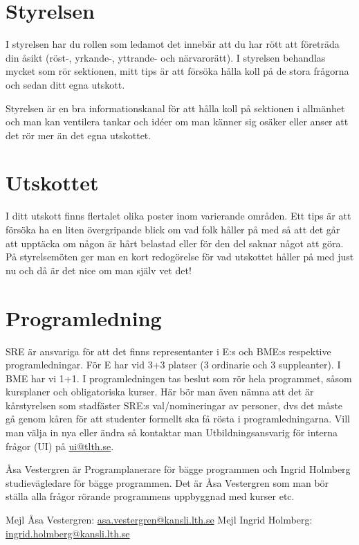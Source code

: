 \documentclass[10pt]{article}
\begin{document}
\newpage
\section{Styrelsen}
I styrelsen har du rollen som ledamot det innebär att du har rött att företräda din åsikt (röst-, yrkande-, yttrande- och närvarorätt). I styrelsen behandlas mycket som rör sektionen, mitt tips är att försöka hålla koll på de stora frågorna och sedan ditt egna utskott. 

Styrelsen är en bra informationskanal för att hålla koll på sektionen i allmänhet och man kan ventilera tankar och idéer om man känner sig osäker eller anser att det rör mer än det egna utskottet. 

\section{Utskottet}
I ditt utskott finns flertalet olika poster inom varierande områden. Ett tips är att försöka ha en liten övergripande blick om vad folk håller på med så att det går att upptäcka om någon är hårt belastad eller för den del saknar något att göra. På styrelsemöten ger man en kort redogörelse för vad utskottet håller på med just nu och då är det nice om man själv vet det!

\section{Programledning}
SRE är ansvariga för att det finns representanter i E:s och BME:s respektive programledningar. För E har vid 3+3 platser (3 ordinarie och 3 suppleanter). I BME har vi 1+1. I programledningen tas beslut som rör hela programmet, såsom kursplaner och obligatoriska kurser. Här bör man även nämna att det är kårstyrelsen som stadfäster SRE:s val/nomineringar av personer, dvs det måste gå genom kåren för att studenter formellt ska få rösta i programledningarna. Vill man välja in nya eller ändra så kontaktar man Utbildningsansvarig för interna frågor (UI) på \hyperref{mailto:ui@tlth.se}{}{}{ui@tlth.se}. 

Åsa Vestergren är Programplanerare för bägge programmen och Ingrid Holmberg studievägledare för bägge programmen. Det är Åsa Vestergren som man bör ställa alla frågor rörande programmens uppbyggnad med kurser etc.

Mejl Åsa Vestergren: \hyperref{mailto:asa.vestergren@kansli.lth.se}{}{}{asa.vestergren@kansli.lth.se}
Mejl Ingrid Holmberg: \hyperref{mailto:ingrid.holmberg@kansli.lth.se}{}{}{ingrid.holmberg@kansli.lth.se}
\end{document}
